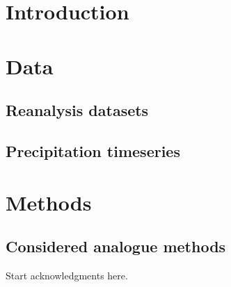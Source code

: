 \documentclass[twocol]{ametsoc}
\begin{document}


\section{Introduction}

\section{Data}

\subsection{Reanalysis datasets}

\subsection{Precipitation timeseries}

\cite{Compo2011}

\cite{Kanamitsu2002}



\section{Methods}

\subsection{Considered analogue methods}





%
\acknowledgments
Start acknowledgments here.

%



\end{document}
